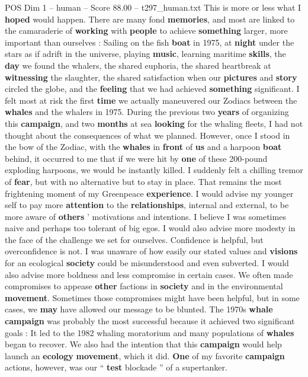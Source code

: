 \begin{textsample}{POS Dim 1 – human – Score 88.00 – t297\_human.txt}
This is more or less what I \textbf{hoped} would happen.
There are many fond \textbf{memories}, and most are linked to the camaraderie of \textbf{working} with \textbf{people} to achieve \textbf{something} larger, more important than ourselves : Sailing on the fish \textbf{boat} in 1975, at \textbf{night} under the stars as if adrift in the universe, playing \textbf{music}, learning maritime \textbf{skills}, the \textbf{day} we found the whalers, the shared euphoria, the shared heartbreak at \textbf{witnessing} the slaughter, the shared satisfaction when our \textbf{pictures} and \textbf{story} circled the globe, and the \textbf{feeling} that we had achieved \textbf{something} significant.
I felt most at risk the first \textbf{time} we actually maneuvered our Zodiacs between the \textbf{whales} and the whalers in 1975.
During the previous two \textbf{years} of organizing this \textbf{campaign}, and two \textbf{months} at sea \textbf{looking} for the whaling fleets, I had not thought about the consequences of what we planned.
However, once I stood in the bow of the Zodiac, with the \textbf{whales} in \textbf{front} of \textbf{us} and a harpoon \textbf{boat} behind, it occurred to me that if we were hit by \textbf{one} of these 200-pound exploding harpoons, we would be instantly killed.
I suddenly felt a chilling tremor of \textbf{fear}, but with no alternative but to stay in place.
That remains the most frightening moment of my Greenpeace \textbf{experience}.
I would advise my younger self to pay more \textbf{attention} to the \textbf{relationships}, internal and external, to be more aware of \textbf{others} ’ motivations and intentions.
I believe I was sometimes naive and perhaps too tolerant of big egos.
I would also advise more modesty in the face of the challenge we set for ourselves.
Confidence is helpful, but overconfidence is not.
I was unaware of how easily our stated values and \textbf{visions} for an ecological \textbf{society} could be misunderstood and even subverted.
I would also advise more boldness and less compromise in certain cases.
We often made compromises to appease \textbf{other} factions in \textbf{society} and in the environmental \textbf{movement}.
Sometimes those compromises might have been helpful, but in some cases, we \textbf{may} have allowed our message to be blunted.
The 1970s \textbf{whale} \textbf{campaign} was probably the most successful because it achieved two significant goals : It led to the 1982 whaling moratorium and many populations of \textbf{whales} began to recover.
We also had the intention that this \textbf{campaign} would help launch an \textbf{ecology} \textbf{movement}, which it did. \textbf{One} of my favorite \textbf{campaign} actions, however, was our “ \textbf{test} blockade ” of a supertanker.

\end{textsample}
